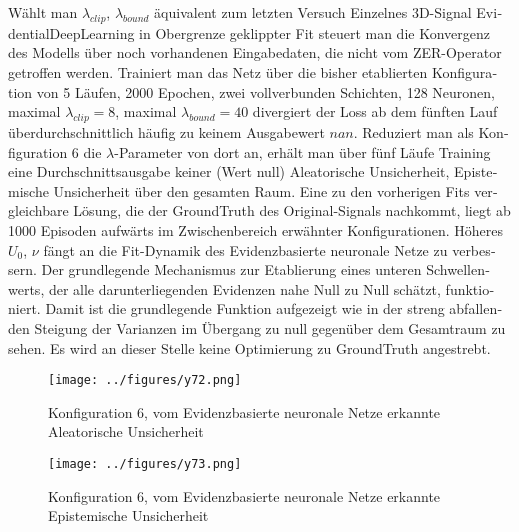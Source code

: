 \begin{otherlanguage}{ngerman}
Wählt man $\lambda_{clip}$, $\lambda_{bound}$ äquivalent zum letzten Versuch \glqq{}Einzelnes 3D-Signal \gls{EvidentialDeepLearning} in Obergrenze geklippter Fit\grqq{} steuert man die Konvergenz des Modells über noch vorhandenen Eingabedaten, die nicht vom ZER-Operator getroffen werden. Trainiert man das Netz über die bisher etablierten Konfiguration von 5 Läufen, 2000 Epochen, zwei vollverbunden Schichten, 128 Neuronen, maximal $\lambda_{clip}=8$, maximal $\lambda_{bound}=40$ divergiert der Loss ab dem fünften Lauf überdurchschnittlich häufig zu keinem Ausgabewert $nan$. Reduziert man als Konfiguration 6 die $\lambda$-Parameter von dort an, erhält man über fünf Läufe Training eine Durchschnittsausgabe keiner (Wert \glqq{}null\grqq{}) \gls{Aleatorische Unsicherheit}, \gls{Epistemische Unsicherheit} über den gesamten Raum. Eine zu den vorherigen Fits vergleichbare Lösung, die der \gls{GroundTruth} des Original-Signals nachkommt, liegt ab 1000 Episoden aufwärts im Zwischenbereich erwähnter Konfigurationen. Höheres $U_{0}$, $\nu$ fängt an die Fit-Dynamik des \gls{Evidenzbasierte neuronale Netze} zu verbessern. Der grundlegende Mechanismus zur Etablierung eines unteren Schwellenwerts, der alle darunterliegenden Evidenzen nahe Null zu Null schätzt, funktioniert. Damit ist die grundlegende Funktion aufgezeigt wie in der streng abfallenden Steigung der Varianzen im Übergang zu null gegenüber dem Gesamtraum zu sehen. Es wird an dieser Stelle keine Optimierung zu \gls{GroundTruth} angestrebt.  



\begin{figure}[!ht]
  \centering

  \begin{minipage}[t]{0.49\textwidth}
    \centering
    \texttt{[image: ../figures/y72.png]}
    \captionsetup{justification=raggedright,singlelinecheck=false}
    \caption*{Konfiguration 6, vom \gls{Evidenzbasierte neuronale Netze} erkannte \gls{Aleatorische Unsicherheit}}
    \label{fig:bild32}
  \end{minipage}%
  \hfill
  \begin{minipage}[t]{0.49\textwidth}
    \centering
    \texttt{[image: ../figures/y73.png]}
    \captionsetup{justification=raggedright,singlelinecheck=false}
    \caption*{Konfiguration 6, vom \gls{Evidenzbasierte neuronale Netze} erkannte \gls{Epistemische Unsicherheit}}
    \label{fig:bild33}
  \end{minipage}


\end{figure}
\end{otherlanguage}
